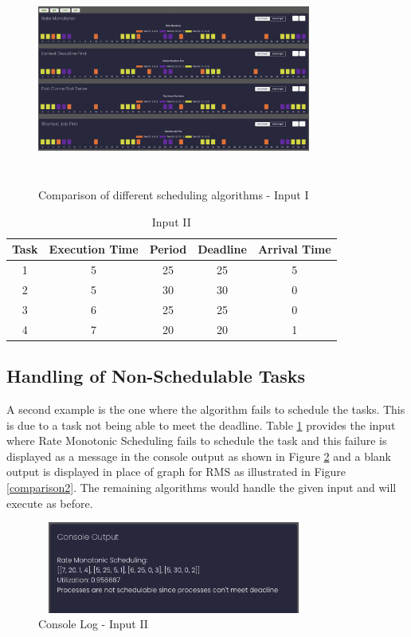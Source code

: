 \documentclass[12pt, conference]{IEEEtran}
\begin{document}
\begin{figure}
\centerline{\includegraphics[width=9cm, height=7cm]{Output.png}}
\caption{Comparison of different scheduling algorithms - Input I}
\label{comparison}
\end{figure} 

\begin{table}[]
    \centering
    \caption{Input II}
    \label{tab:input2}
    \begin{tabular}{|c|c|c|c|c|}
    \hline
        Task & Execution Time & Period & Deadline & Arrival Time  \\
    \hline
         1 & 5 & 25 & 25 & 5 \\  
         \hline
         2 & 5 & 30 & 30 & 0 \\
         \hline
         3 & 6 & 25 & 25 & 0 \\
         \hline
         4 & 7 & 20 & 20 & 1 \\
         \hline
    \end{tabular}
\end{table}


\subsection{Handling of Non-Schedulable Tasks}
A second example is the one where the algorithm fails to schedule the tasks. This is due to a task not being able to meet the deadline. Table \ref{tab:input2} provides the input where Rate Monotonic Scheduling fails to schedule the task and this failure is displayed as a message in the console output as shown in Figure \ref{console2} and a blank output is displayed in place of graph for RMS as illustrated in Figure \ref{comparison2}. The remaining algorithms would handle the given input and will execute as before.

\begin{figure}
\centerline{\includegraphics[width=9cm, height=3cm]{Console2.png}}
\caption{Console Log - Input II}
\label{console2}
\end{figure}
\end{document}
